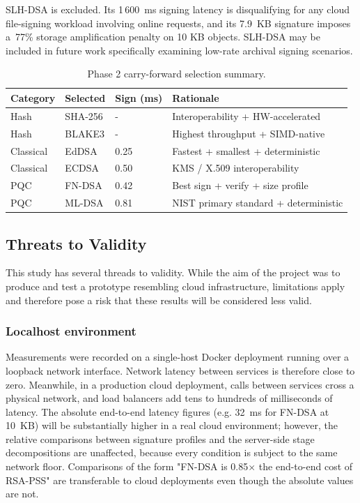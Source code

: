 \documentclass[12pt,a4paper]{article}
\begin{document}
SLH-DSA is excluded. Its 1\,600~ms signing latency is disqualifying for any cloud file-signing workload involving online requests, and its 7.9~KB signature imposes a~77\% storage amplification penalty on 10 KB objects. SLH-DSA may be included in future work specifically examining low-rate archival signing scenarios.

\begin{table}[H]
\centering
\caption{Phase 2 carry-forward selection summary.}
\label{tab:selection_summary}
\begin{tabular}{l l l l}
\toprule
Category & Selected & Sign (ms) & Rationale \\
\midrule
Hash       & SHA-256 & - & Interoperability + HW-accelerated \\
Hash       & BLAKE3  & - & Highest throughput + SIMD-native \\
Classical  & EdDSA   & 0.25 & Fastest + smallest + deterministic \\
Classical  & ECDSA   & 0.50 & KMS / X.509 interoperability \\
PQC        & FN-DSA  & 0.42 & Best sign + verify + size profile \\
PQC        & ML-DSA  & 0.81 & NIST primary standard + deterministic \\
\bottomrule
\end{tabular}
\end{table}

\subsection{Threats to Validity}
\label{sec:results:threats}

This study has several threads to validity. While the aim of the project was to produce and test a prototype resembling cloud infrastructure, limitations apply and therefore pose a risk that these results will be considered less valid.

\subsubsection{Localhost environment} Measurements were recorded on a single-host Docker deployment running over a loopback network interface. Network latency between services is therefore close to zero. Meanwhile, in a production cloud deployment, calls between services cross a physical network, and load balancers add tens to hundreds of milliseconds of latency. The absolute end-to-end latency figures (e.g. 32~ms for FN-DSA at 10~KB) will be substantially higher in a real cloud environment; however, the relative comparisons between signature profiles and the server-side stage decompositions are unaffected, because every condition is subject to the same network floor. Comparisons of the form "FN-DSA is 0.85$\times$ the end-to-end cost of RSA-PSS" are transferable to cloud deployments even though the absolute values are not.
\end{document}
